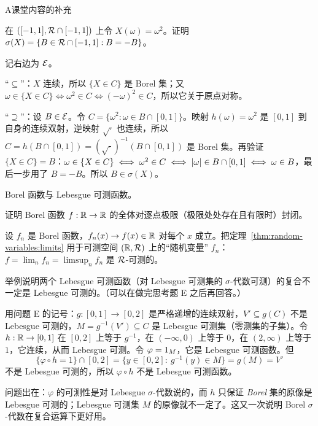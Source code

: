 \begin{exercises}{A}{课堂内容的补充}
\item\label{ex:random-variables:A6} 在 $([-1,1],\mathcal{R}\cap[-1,1])$ 上令 $X(\omega)=\omega^2$。证明 $\sigma(X)=\{B\in\mathcal{R}\cap[-1,1]: B=-B\}$。
\begin{solution}
记右边为 $\mathcal{E}$。

“$\subseteq$”：$X$ 连续，所以 $\{X\in C\}$ 是 Borel 集；又 $\omega\in\{X\in C\}\iff\omega^2\in C\iff(-\omega)^2\in C$，所以它关于原点对称。

“$\supseteq$”：设 $B\in\mathcal{E}$。令 $C=\{\omega^2:\omega\in B\cap[0,1]\}$。映射 $h(\omega)=\omega^2$ 是 $[0,1]$ 到自身的连续双射，逆映射 $\sqrt{\cdot}$ 也连续，所以 $C=h(B\cap[0,1])=(\sqrt{\cdot})^{-1}(B\cap[0,1])$ 是 Borel 集。再验证 $\{X\in C\}=B$：$\omega\in\{X\in C\}\iff\omega^2\in C\iff\lvert \omega\rvert\in B\cap[0,1]\iff\omega\in B$，最后一步用了 $B=-B$。所以 $B\in\sigma(X)$。
\end{solution}

\item\label{ex:random-variables:A7} Borel 函数与 Lebesgue 可测函数。
\begin{questions}
\item 证明 Borel 函数 $f:\mathbb{R}\to\mathbb{R}$ 的全体对逐点极限（极限处处存在且有限时）封闭。
\begin{solution}
设 $f_n$ 是 Borel 函数，$f_n(x)\to f(x)\in\mathbb{R}$ 对每个 $x$ 成立。把定理~\ref{thm:random-variables:limits} 用于可测空间 $(\mathbb{R},\mathcal{R})$ 上的“随机变量” $f_n$：$f=\lim_nf_n=\limsup_nf_n$ 是 $\mathcal{R}$-可测的。
\end{solution}
\item 举例说明两个 Lebesgue 可测函数（对 Lebesgue 可测集的 $\sigma$-代数可测）的复合不一定是 Lebesgue 可测的。（可以在做完思考题 E 之后再回答。）
\begin{solution}
用问题 E 的记号：$g:[0,1]\to[0,2]$ 是严格递增的连续双射，$V'\subseteq g(C)$ 不是 Lebesgue 可测的，$M=g^{-1}(V')\subseteq C$ 是 Lebesgue 可测集（零测集的子集）。令 $h:\mathbb{R}\to[0,1]$ 在 $[0,2]$ 上等于 $g^{-1}$，在 $(-\infty,0)$ 上等于 $0$，在 $(2,\infty)$ 上等于 $1$，它连续，从而 Lebesgue 可测。令 $\varphi=1_M$，它是 Lebesgue 可测函数。但
\[
\{\varphi\circ h=1\}\cap[0,2]=\{y\in[0,2]:\ g^{-1}(y)\in M\}=g(M)=V'
\]
不是 Lebesgue 可测的，所以 $\varphi\circ h$ 不是 Lebesgue 可测函数。

问题出在：$\varphi$ 的可测性是对 Lebesgue $\sigma$-代数说的，而 $h$ 只保证 \emph{Borel} 集的原像是 Lebesgue 可测的；Lebesgue 可测集 $M$ 的原像就不一定了。这又一次说明 Borel $\sigma$-代数在复合运算下更好用。
\end{solution}
\end{questions}


\end{exercises}
